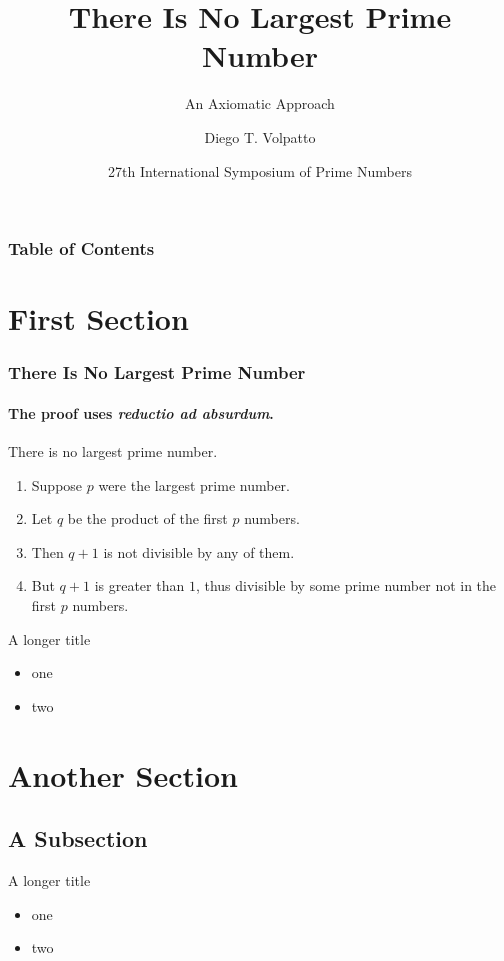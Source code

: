 \documentclass{beamer}
\title{There Is No Largest Prime Number}
\subtitle{An Axiomatic Approach}
\date[ISPN ’80]{27th International Symposium of Prime Numbers}
\author[Diego T. Volpatto]{
				Diego T. Volpatto\inst{1}
				}
\institute[LNCC] %
{
\inst{1} Laboratório Nacional de Computação Científica %
}
\begin{document}
\begin{frame}
\titlepage
\end{frame}

\begin{frame}
\frametitle{Table of Contents} %
\tableofcontents %
\end{frame}

\section{First Section}

\begin{frame} 
\frametitle{There Is No Largest Prime Number} 
\framesubtitle{The proof uses \textit{reductio ad absurdum}.} 
\begin{theorem}
There is no largest prime number. \end{theorem} 
\begin{enumerate} 
\item<1-| alert@1> Suppose $p$ were the largest prime number. 
\item<2-> Let $q$ be the product of the first $p$ numbers. 
\item<3-> Then $q+1$ is not divisible by any of them. 
\item<1-> But $q + 1$ is greater than $1$, thus divisible by some prime
number not in the first $p$ numbers.
\end{enumerate}
\end{frame}

\begin{frame}{A longer title}
\begin{itemize}
\item one
\item two
\end{itemize}
\end{frame}

\section{Another Section}
\subsection{A Subsection}

\begin{frame}{A longer title}
\begin{itemize}
\item one
\item two
\end{itemize}
\end{frame}
\end{document}
